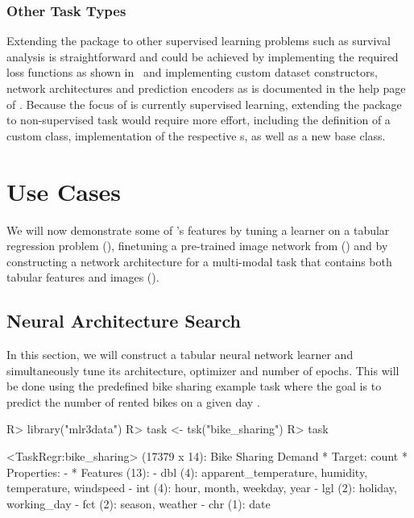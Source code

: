 \documentclass[article]{jss}
\theoremstyle{definition}
\begin{document}
\subsubsection{Other Task Types}

Extending the package to other supervised learning problems such as survival analysis is straightforward and could be achieved by implementing the required loss functions as shown in~ and implementing custom dataset constructors, network architectures and prediction encoders as is documented in the help page of .
Because the focus of  is currently  supervised learning, extending the package to non-supervised task would require more effort, including the definition of a custom  class, implementation of the respective s, as well as a new  base class.

\section{Use Cases}\label{sec:use-cases}

We will now demonstrate some of 's features by tuning a \torch{} learner on a tabular regression problem (), finetuning a pre-trained image network from  () and by constructing a network architecture for a multi-modal task that contains both tabular features and images ().

\subsection{Neural Architecture Search}\label{sec:tuning}

In this section, we will construct a tabular neural network learner and simultaneously tune its architecture, optimizer and number of epochs.
This will be done using the predefined bike sharing example task where the goal is to predict the number of rented bikes on a given day  \citep{ref-bikesharing-2019}.

\begin{CodeInput}
R> library("mlr3data")
R> task <- tsk("bike_sharing")
R> task
\end{CodeInput}
\begin{CodeOutput}
<TaskRegr:bike_sharing> (17379 x 14): Bike Sharing Demand
* Target: count
* Properties: -
* Features (13):
  - dbl (4): apparent_temperature, humidity, temperature, windspeed
  - int (4): hour, month, weekday, year
  - lgl (2): holiday, working_day
  - fct (2): season, weather
  - chr (1): date
\end{CodeOutput}
\end{document}

